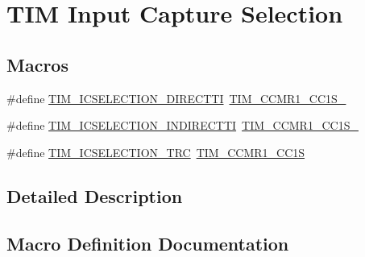 \hypertarget{group___t_i_m___input___capture___selection}{}\section{T\+IM Input Capture Selection}
\label{group___t_i_m___input___capture___selection}
\subsection*{Macros}
\begin{DoxyCompactItemize}
\item 
\#define \mbox{\hyperlink{group___t_i_m___input___capture___selection_gac3be2fd9c576e84e0ebcfc7b3c0773a3}{T\+I\+M\+\_\+\+I\+C\+S\+E\+L\+E\+C\+T\+I\+O\+N\+\_\+\+D\+I\+R\+E\+C\+T\+TI}}~\mbox{\hyperlink{group___peripheral___registers___bits___definition_ga1e4968b5500d58d1aebce888da31eb5d}{T\+I\+M\+\_\+\+C\+C\+M\+R1\+\_\+\+C\+C1\+S\+\_}}
\item 
\#define \mbox{\hyperlink{group___t_i_m___input___capture___selection_gab9754d4318abcd7fe725e3ee2e4496d4}{T\+I\+M\+\_\+\+I\+C\+S\+E\+L\+E\+C\+T\+I\+O\+N\+\_\+\+I\+N\+D\+I\+R\+E\+C\+T\+TI}}~\mbox{\hyperlink{group___peripheral___registers___bits___definition_ga299207b757f31c9c02471ab5f4f59dbe}{T\+I\+M\+\_\+\+C\+C\+M\+R1\+\_\+\+C\+C1\+S\+\_}}
\item 
\#define \mbox{\hyperlink{group___t_i_m___input___capture___selection_ga9e0191bbf1a82dd9150b9283c39276e7}{T\+I\+M\+\_\+\+I\+C\+S\+E\+L\+E\+C\+T\+I\+O\+N\+\_\+\+T\+RC}}~\mbox{\hyperlink{group___peripheral___registers___bits___definition_ga95291df1eaf532c5c996d176648938eb}{T\+I\+M\+\_\+\+C\+C\+M\+R1\+\_\+\+C\+C1S}}
\end{DoxyCompactItemize}


\subsection{Detailed Description}


\subsection{Macro Definition Documentation}
\mbox{\label{group___t_i_m___input___capture___selection_gac3be2fd9c576e84e0ebcfc7b3c0773a3}} 
